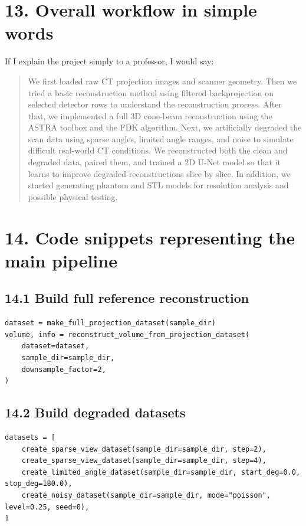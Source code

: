\documentclass[12pt,a4paper]{article}
\begin{document}
\section*{13. Overall workflow in simple words}
If I explain the project simply to a professor, I would say:

\begin{quote}
We first loaded raw CT projection images and scanner geometry. Then we tried a basic reconstruction method using filtered backprojection on selected detector rows to understand the reconstruction process. After that, we implemented a full 3D cone-beam reconstruction using the ASTRA toolbox and the FDK algorithm. Next, we artificially degraded the scan data using sparse angles, limited angle ranges, and noise to simulate difficult real-world CT conditions. We reconstructed both the clean and degraded data, paired them, and trained a 2D U-Net model so that it learns to improve degraded reconstructions slice by slice. In addition, we started generating phantom and STL models for resolution analysis and possible physical testing.
\end{quote}

\section*{14. Code snippets representing the main pipeline}

\subsection*{14.1 Build full reference reconstruction}
\begin{lstlisting}[style=py]
dataset = make_full_projection_dataset(sample_dir)
volume, info = reconstruct_volume_from_projection_dataset(
    dataset=dataset,
    sample_dir=sample_dir,
    downsample_factor=2,
)
\end{lstlisting}

\subsection*{14.2 Build degraded datasets}
\begin{lstlisting}[style=py]
datasets = [
    create_sparse_view_dataset(sample_dir=sample_dir, step=2),
    create_sparse_view_dataset(sample_dir=sample_dir, step=4),
    create_limited_angle_dataset(sample_dir=sample_dir, start_deg=0.0, stop_deg=180.0),
    create_noisy_dataset(sample_dir=sample_dir, mode="poisson", level=0.25, seed=0),
]
\end{lstlisting}
\end{document}
